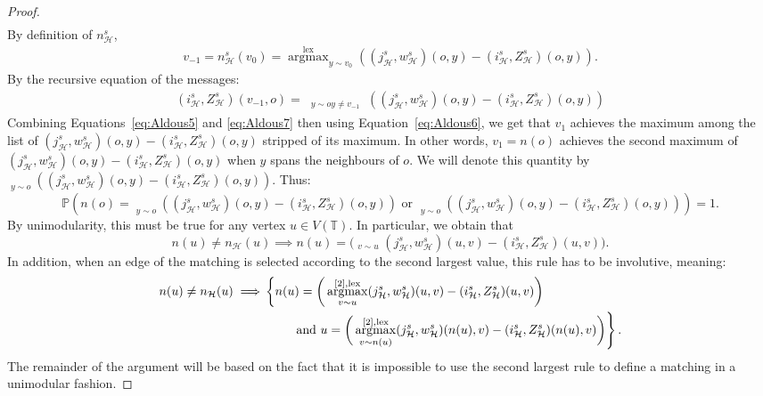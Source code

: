 \documentclass[10pt,a4paper]{amsart}
\DeclareMathOperator*{\argmax}{argmax}
\DeclareMathOperator*{\argmaxlex}{\overset{\lex}{\argmax}}
\DeclareMathOperator*{\argmaxxlex}{\overset{[2],\lex}{\argmax}}
\DeclareMathOperator{\lex}{lex}
\DeclareMathOperator*{\maxlex}{\overset{\lex}{\max}}
\begin{document}
\begin{proof}
\begin{align}
\end{align}
By definition of $n^s_{\mathcal{H}}$,
\begin{align}\label{eq:Aldous6}
v_{-1}=n^s_{\mathcal{H}}(v_0) = \overset{\lex}{\argmax}_{y \sim v_0 }((j_{\mathcal{H}}^s,w_{\mathcal{H}}^s)(o,y)-(i^s_{\mathcal{H}},Z^s_{\mathcal{H}})(o,y)).
\end{align}
By the recursive equation of the messages: 
\begin{align}\label{eq:Aldous7}
    (i^s_{\mathcal{H}},Z^s_{\mathcal{H}})(v_{-1},o)=\maxlex_{\substack {y \sim o  y \neq v_{-1}}}((j_{\mathcal{H}}^s,w_{\mathcal{H}}^s)(o,y)-(i^s_{\mathcal{H}},Z^s_{\mathcal{H}})(o,y))    
\end{align}
Combining Equations~\eqref{eq:Aldous5} and \eqref{eq:Aldous7} then using Equation~\eqref{eq:Aldous6}, we get that $v_1$ achieves the maximum among the list of $(j_{\mathcal{H}}^s,w_{\mathcal{H}}^s)(o,y)-(i^s_{\mathcal{H}},Z^s_{\mathcal{H}})(o,y)$ stripped of its maximum. 
In other words, $v_1=n(o)$ achieves the second maximum of $(j_{\mathcal{H}}^s,w_{\mathcal{H}}^s)(o,y)-(i^s_{\mathcal{H}},Z^s_{\mathcal{H}})(o,y)$ when $y$ spans the neighbours of $o$. We will denote this quantity by ${\underset{y \sim o}{\argmaxxlex}}( (j_{\mathcal{H}}^s,w_{\mathcal{H}}^s)(o,y)-(i^s_{\mathcal{H}},Z^s_{\mathcal{H}})(o,y))$. 
Thus:
\[\mathbb{P}\left( n(o)=\underset{y \sim o}{\argmaxlex}((j_{\mathcal{H}}^s,w_{\mathcal{H}}^s)(o,y)-(i^s_{\mathcal{H}},Z^s_{\mathcal{H}})(o,y)) \text{ or } \underset{y \sim o}{\argmaxxlex}((j_{\mathcal{H}}^s,w_{\mathcal{H}}^s)(o,y)-(i^s_{\mathcal{H}},Z^s_{\mathcal{H}})(o,y))  \right)=1. \]
By unimodularity, this must be true for any vertex $u \in V(\mathbb{T})$. In particular, we obtain that
\[ n(u)\neq n_{\mathcal{H}}(u)  \implies n(u)= \bigg(\argmaxxlex_{v \sim u} (j_{\mathcal{H}}^s,w_{\mathcal{H}}^s)(u,v)-(i_{\mathcal{H}}^s,Z_{\mathcal{H}}^s)(u,v) \bigg) . \]
In addition, when an edge of the matching is selected according to the second largest value, this rule has to be involutive, meaning:
\begin{align} \label{eq:argmax2involutif}
    n(u)\neq n_{\mathcal{H}}(u)  \implies &\left\{  n(u)= \bigg(\argmaxxlex_{v \sim u} (j_{\mathcal{H}}^s,w_{\mathcal{H}}^s)(u,v)-(i_{\mathcal{H}}^s,Z_{\mathcal{H}}^s)(u,v) \bigg) \right. \notag \\
    & \qquad  \left. \text{ and } u= \bigg(\argmaxxlex_{v \sim n(u)} (j_{\mathcal{H}}^s,w_{\mathcal{H}}^s)(n(u),v)-(i_{\mathcal{H}}^s,Z_{\mathcal{H}}^s)(n(u),v) \bigg) \right\}.
\end{align}
The remainder of the argument will be based on the fact that it is impossible to use the second largest rule to define a matching in a unimodular fashion.


\end{proof}
\end{document}
